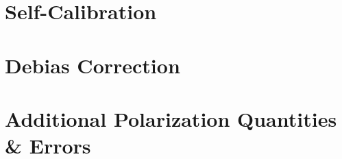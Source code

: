 \begin{table}[h!]
\begin{tabular}{lllll}


\bottomrule
\end{tabular}
\begin{tablenotes}
\footnotesize
\item {}
\end{tablenotes}
\label{tab: alma_observations}
\end{table}

















\section{Self-Calibration}




\section{Debias Correction}
\label{sec: debias_correction}









\section{Additional Polarization Quantities \& Errors}




